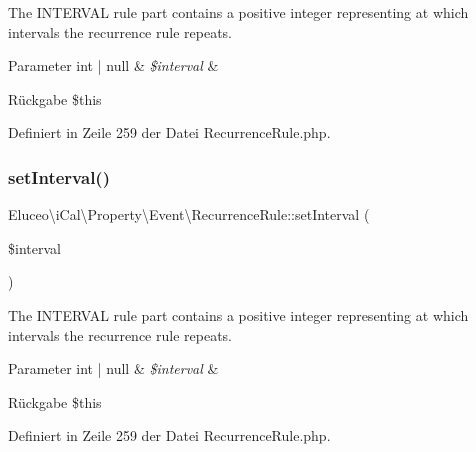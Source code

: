 The I\+N\+T\+E\+R\+V\+AL rule part contains a positive integer representing at which intervals the recurrence rule repeats.


\begin{DoxyParams}[1]{Parameter}
int | null & {\em \$interval} & \\
\hline
\end{DoxyParams}
\begin{DoxyReturn}{Rückgabe}
\$this 
\end{DoxyReturn}


Definiert in Zeile 259 der Datei Recurrence\+Rule.\+php.

\mbox{\label{class_eluceo_1_1i_cal_1_1_property_1_1_event_1_1_recurrence_rule_ac6b278d4cf770de7f9086d4567a5e098}} 
\subsubsection{\texorpdfstring{set\+Interval()}{setInterval()}\hspace{0.1cm}{\footnotesize\ttfamily [3/3]}}
{\footnotesize\ttfamily Eluceo\textbackslash{}i\+Cal\textbackslash{}\+Property\textbackslash{}\+Event\textbackslash{}\+Recurrence\+Rule\+::set\+Interval (\begin{DoxyParamCaption}\item[{}]{\$interval }\end{DoxyParamCaption})}

The I\+N\+T\+E\+R\+V\+AL rule part contains a positive integer representing at which intervals the recurrence rule repeats.


\begin{DoxyParams}[1]{Parameter}
int | null & {\em \$interval} & \\
\hline
\end{DoxyParams}
\begin{DoxyReturn}{Rückgabe}
\$this 
\end{DoxyReturn}


Definiert in Zeile 259 der Datei Recurrence\+Rule.\+php.

\mbox{\label{class_eluceo_1_1i_cal_1_1_property_1_1_event_1_1_recurrence_rule_a4734805877b1b97c7fd0be51e76652f5}} 
